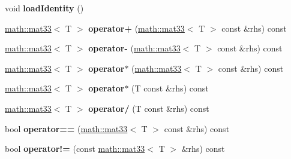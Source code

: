 \begin{DoxyCompactItemize}
\item 
\hypertarget{classmath_1_1mat33_a13ec1c970e65b3b77cc1bda61e11e405}{
void {\bfseries loadIdentity} ()}
\label{classmath_1_1mat33_a13ec1c970e65b3b77cc1bda61e11e405}

\item 
\hypertarget{classmath_1_1mat33_ab8e29cb75a9d3a5ac7465701b0d085e7}{
\hyperlink{classmath_1_1mat33}{math::mat33}$<$ T $>$ {\bfseries operator+} (\hyperlink{classmath_1_1mat33}{math::mat33}$<$ T $>$ const \&rhs) const }
\label{classmath_1_1mat33_ab8e29cb75a9d3a5ac7465701b0d085e7}

\item 
\hypertarget{classmath_1_1mat33_a7ff7982969708087c4e9d742ed4b82a9}{
\hyperlink{classmath_1_1mat33}{math::mat33}$<$ T $>$ {\bfseries operator-\/} (\hyperlink{classmath_1_1mat33}{math::mat33}$<$ T $>$ const \&rhs) const }
\label{classmath_1_1mat33_a7ff7982969708087c4e9d742ed4b82a9}

\item 
\hypertarget{classmath_1_1mat33_a539a075bdab7142f1287ad913fb51df6}{
\hyperlink{classmath_1_1mat33}{math::mat33}$<$ T $>$ {\bfseries operator$\ast$} (\hyperlink{classmath_1_1mat33}{math::mat33}$<$ T $>$ const \&rhs) const }
\label{classmath_1_1mat33_a539a075bdab7142f1287ad913fb51df6}

\item 
\hypertarget{classmath_1_1mat33_aa27d6f8275975ebe240ffc3d673170ea}{
\hyperlink{classmath_1_1mat33}{math::mat33}$<$ T $>$ {\bfseries operator$\ast$} (T const \&rhs) const }
\label{classmath_1_1mat33_aa27d6f8275975ebe240ffc3d673170ea}

\item 
\hypertarget{classmath_1_1mat33_aa01273af4a19fc9b1b8ab062c776b64a}{
\hyperlink{classmath_1_1mat33}{math::mat33}$<$ T $>$ {\bfseries operator/} (T const \&rhs) const }
\label{classmath_1_1mat33_aa01273af4a19fc9b1b8ab062c776b64a}

\item 
\hypertarget{classmath_1_1mat33_a85cd630c71cdad7cedaa76ed5bb833d5}{
bool {\bfseries operator==} (\hyperlink{classmath_1_1mat33}{math::mat33}$<$ T $>$ const \&rhs) const }
\label{classmath_1_1mat33_a85cd630c71cdad7cedaa76ed5bb833d5}

\item 
\hypertarget{classmath_1_1mat33_a771bf672147d8f7302cce640d741707c}{
bool {\bfseries operator!=} (const \hyperlink{classmath_1_1mat33}{math::mat33}$<$ T $>$ \&rhs) const }
\label{classmath_1_1mat33_a771bf672147d8f7302cce640d741707c}


\end{DoxyCompactItemize}

